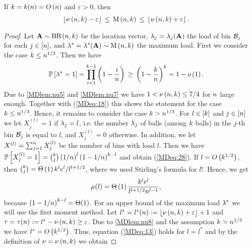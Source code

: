 \begin{thm}\label{MDthm:concentration_balls_bins}
If $k=k(n)=O\left(n\right)$ and $\varepsilon>0$, then \whp
\begin{align*}
\left\lfloor\nu\left(n, k\right)-\varepsilon\right\rfloor\hspace{0.06cm}\leq\hspace{0.06cm} \operatorname{M}\left(n, k\right)\hspace{0.06cm}\leq\hspace{0.06cm} \left\lfloor\nu\left(n, k\right)+\varepsilon\right\rfloor.
\end{align*}
\end{thm}
\begin{proof}
Let $\mathbf{A}\sim \operatorname{BB}\left(n, k\right)$ be the location vector, $\lambda_j=\lambda_j(\mathbf{A})$ the load of bin $\mathcal{B}_j$ for each $j\in[n]$, and $\lambda^\ast=\lambda^\ast(\mathbf{A})\sim \operatorname{M}\left(n, k\right)$ the maximum load. First we consider the case $k\leq n^{1/3}$. Then we have
\begin{align}\label{MDeq:18}
	\mathbb{P}\left[\lambda^\ast=1\right]=\prod_{i=1}^{k-1}\left(1-\frac{i}{n}\right)\hspace{0.06cm}\geq\hspace{0.06cm} \left(1-\frac{k}{n}\right)^k=1-o\left(1\right).
\end{align}
Due to \ref{MDlem:nu5} and \ref{MDlem:nu7} we have $1<\nu\left(n, k\right)\leq 7/4$ for $n$ large enough. Together with (\ref{MDeq:18}) this shows the statement for the case $k\leq n^{1/3}$. Hence, it remains to consider the case $k>n^{1/3}$. For $l\in[k]$ and $j\in[n]$ we let $X_j^{(l)}=1$ if $\lambda_j=l$, i.e. the number $\lambda_j$ of balls (among $k$ balls) in the $j$-th bin $\mathcal{B}_j$ is equal to $l$, and $X_j^{(l)}=0$ otherwise. In addition, we let $X^{(l)}=\sum_{j=1}^{n}X_j^{(l)}$ be the number of bins with load $l$. Then we have 
$\mathbb{P}\left[X_j^{(l)}=1\right]=\binom{k}{l}\left(1/n\right)^l\left(1-1/n\right)^{k-l}$ and obtain (\ref{MDeq:28}). If $l=O\left(k^{1/2}\right)$, then
$\binom{k}{l}=\Theta\left(1\right)k^le^l/l^{l+1/2}$,
where we used Stirling's formula for $l!$. Hence, we get 
\begin{align}\label{MDeq:13}
	\mu(l)=\Theta\left(1\right)\frac{k^l e^l}{l^{l+1/2}n^{l-1}},
\end{align}
because $\left(1-1/n\right)^{k-l}=\Theta(1)$. For an upper bound of the maximum load $\lambda^\ast$ we will use the first moment method. Let $l^\ast=l^\ast(n):=\left\lfloor\nu\left(n, k\right)+\varepsilon\right\rfloor+1$ and $\tau=\tau(n):=l^\ast-\nu\left(n, k\right)\geq\varepsilon$. Due to \ref{MDlem:nu8} and the assumption $k> n^{1/3}$ we have $l^\ast=O\left(k^{1/2}\right)$. Thus, equation (\ref{MDeq:13}) holds for $l=l^\ast$ and by the definition of $\nu=\nu\left(n, k\right)$ we obtain

\end{proof}
